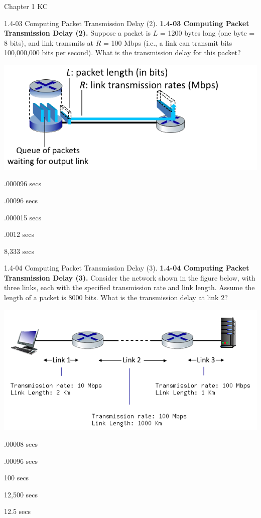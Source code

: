 \documentclass[a4paper]{article}
\begin{document}
\begin{quiz}{Chapter 1 KC}
\begin{multi}[points=1,shuffle=true]{1.4-03 Computing Packet Transmission Delay (2).}
\textbf{1.4-03 Computing Packet Transmission Delay (2).} 
Suppose a packet is $L$ = 1200 bytes long (one byte = 8 bits), and link transmits at $R$ = 100 Mbps (i.e., a link can transmit bits 100,000,000 bits per second).  What is the transmission delay for this packet?
\begin{center}
\includegraphics[width=.8\linewidth]{figs/1.4.2.png}
\end{center}
\item* .000096 secs
\item .00096 secs
\item .000015 secs
\item .0012 secs
\item 8,333 secs
\end{multi}

\begin{multi}[points=1,shuffle=true]{1.4-04 Computing Packet Transmission Delay (3).}
\textbf{1.4-04 Computing Packet Transmission Delay (3).} 
Consider the network shown in the figure below, with three links, each with the specified transmission rate and link length. Assume the length of a packet is 8000 bits. What is the transmission delay at link 2? 
\begin{center}
\includegraphics[width=.9\linewidth]{figs/1.4.4.png}
\end{center}
\item* .00008 secs
\item .00096 secs
\item 100 secs
\item 12,500 secs
\item 12.5 secs
\end{multi}


\end{quiz}
\end{document}
